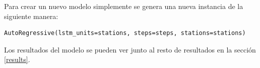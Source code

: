 Para crear un nuevo modelo simplemente se genera una nueva instancia de la siguiente manera:
\begin{verbatim}
AutoRegressive(lstm_units=stations, steps=steps, stations=stations)
\end{verbatim}

Los resultados del modelo se pueden ver junto al resto de resultados en la sección \ref{results}.
